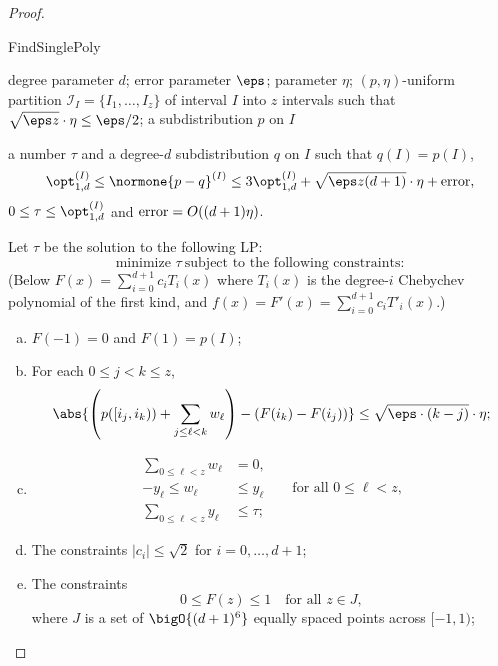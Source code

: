 \begin{proof}
\begin{algorithm}
  \caption{{\sc FindSinglePoly}}
  \begin{algorithmic}[1]
    \Require  degree parameter $d$;
error parameter $\eps$; parameter $\eta$; $(p,\eta)$-uniform partition
$\mathcal{I}_I = \{I_1, \dots, I_{{z}}\}$ of interval $I$ into ${{z}}$ intervals {such that $\sqrt{
\eps z}\cdot \eta \leq \eps/2$}; a subdistribution $p$ on $I$

    \Ensure a number $\tau$ and a degree-$d$
subdistribution $q$ on $I$ such that $q(I) = p(I)$,
\[ 
  \opt^{(I)}_{1,d} \leq \normone{p-q}^{(I)} \leq 3\opt^{(I)}_{1,d} + \sqrt{\eps z (d+1)}
  \cdot \eta + {\rm error},
\]
$0 \leq \tau \leq \opt^{(I)}_{1,d}$ {and ${\rm error} = O({(d+1)}\eta)$}.

\State\label{step:findsinglepoly:1} Let $\tau$ be the solution to the following LP:
\[
\text{minimize~}\tau~\text{subject to the following constraints:}
\]
(Below 
$F(x) = \sum_{i=0}^{d+1} c_i T_i(x)$ where $T_i(x)$ is the degree-$i$
Chebychev polynomial of the first kind, and $f(x)=F'(x) =
\sum_{i=0}^{d+1} c_i T'_i(x)$.)

\begin{enumerate}[(a)]

\item \label{item:total} $F(-1)=0$ and $F(1)=p(I)$;

\item \label{item:phat} For each $0 \leq j < k \leq z$,
\begin{equation} \label{eq:agno-phat}
  \abs{ \left(p([i_j,i_k)) + \sum_{j\leq \ell < k} w_\ell \right) - (F(i_k) - F(i_j)) } \leq \sqrt{\eps \cdot (k-j)} \cdot \eta;
\end{equation}

\item \label{item:robust}
\begin{align}
  \sum_{0\leq \ell < {z}} w_\ell &= 0, \label{item:robust:zerosum} \\
  -y_\ell \leq w_\ell &\leq y_\ell \qquad \text{for all $0\leq \ell < {z}$,} \label{item:robust:absval} \\
  \sum_{0\leq \ell < {z}} y_\ell &\leq \tau \label{item:robust:lb};
\end{align}



\item \label{item:AK}  The constraints $|c_i| \leq \sqrt{2}$ for $i=0,\dots,d+1$;

\item \label{item:AK2} The constraints
\[
0 \leq F(z)  \leq 1 \quad \text{for all~} z \in J,
\]
where $J$ is a set of {$\bigO{(d+1)^6}$} equally spaced points across $[-1,1)$;


\end{enumerate}
\end{algorithmic}
\end{algorithm}
\end{proof}
